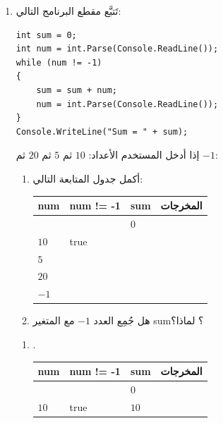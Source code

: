 \documentclass[14pt]{extarticle}
\begin{document}
\begin{enumerate}[itemsep=2em]
\item تَتبَّع مقطع البرنامج التالي:
\begin{boxCode}
\begin{english}
\begin{verbatim}
int sum = 0;
int num = int.Parse(Console.ReadLine());
while (num != -1)
{
    sum = sum + num;
    num = int.Parse(Console.ReadLine());
}
Console.WriteLine("Sum = " + sum);
\end{verbatim}
\end{english}
\end{boxCode}
إذا أدخل المستخدم الأعداد: $10$ ثم $5$ ثم $20$ ثم $-1$:
\begin{enumerate}
    \item أكمل جدول المتابعة التالي:
    \begin{center}
    \begin{english}
    \renewcommand{\arraystretch}{1.4}
    \begin{tabular}{|C{2.5cm}|C{3.5cm}|C{2.5cm}|C{3.5cm}|}
    \hline
    \textbf{num} & \textbf{num != -1} & \textbf{sum} & \textarabic{\textbf{المخرجات}} \\
    \hline
     & & $0$ & \\ \hline
    $10$ & \textenglish{true} & & \\ \hline
    $5$ & & & \\ \hline
    $20$ & & & \\ \hline
    $-1$ & & & \\ \hline
    \end{tabular}
    \end{english}
    \end{center}
    \item هل جُمِع العدد $-1$ مع المتغير \textenglish{sum}؟ لماذا؟
\end{enumerate}
\ifwithsols
\begin{boxSolution}
\begin{enumerate}
    \item .
    \begin{center}
    \begin{english}
    \renewcommand{\arraystretch}{1.4}
    \begin{tabular}{|C{2.5cm}|C{3.5cm}|C{2.5cm}|C{3.5cm}|}
    \hline
    \textbf{num} & \textbf{num != -1} & \textbf{sum} & \textarabic{\textbf{المخرجات}} \\
    \hline
     & & $0$ & \\ \hline
    $10$ & \textenglish{true} & $10$ & \\ \hline

\end{tabular}
\end{english}
\end{center}
\end{enumerate}
\end{boxSolution}
\end{enumerate}
\end{document}
